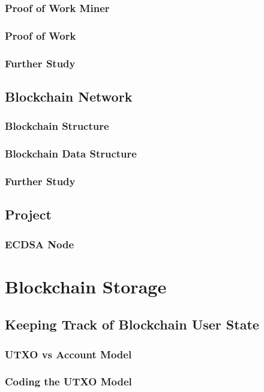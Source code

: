 \documentclass[a4paper, oneside]{book}
\begin{document}
\subsection{Proof of Work Miner}
\subsection{Proof of Work}
\subsection{Further Study}

\section{Blockchain Network}
\subsection{Blockchain Structure}
\subsection{Blockchain Data Structure}
\subsection{Further Study}

\newpage

\section{Project}
\subsection{ECDSA Node}


\chapter{Blockchain Storage}

\section{Keeping Track of Blockchain User State}
\subsection{UTXO vs Account Model}
\subsection{Coding the UTXO Model}
\end{document}
